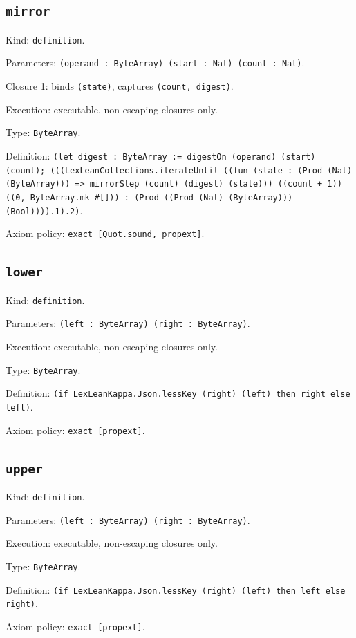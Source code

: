 \documentclass[11pt]{article}
\begin{document}
\subsection*{\texttt{mirror}}
\noindent Kind: \texttt{definition}.\par
\noindent Parameters: \texttt{(operand : ByteArray) (start : Nat) (count : Nat)}.\par
\noindent Closure 1: binds \texttt{(state)}, captures \texttt{(count, digest)}.\par
\noindent Execution: executable, non-escaping closures only.\par
\noindent Type: \texttt{ByteArray}.\par
\noindent Definition: \texttt{(let digest : ByteArray := digestOn (operand) (start) (count); (((LexLeanCollections.iterateUntil ((fun (state : (Prod (Nat) (ByteArray))) => mirrorStep (count) (digest) (state))) ((count + 1)) ((0, ByteArray.mk \#[])) : (Prod ((Prod (Nat) (ByteArray))) (Bool)))).1).2)}.\par
\noindent Axiom policy: \texttt{exact [Quot.sound, propext]}.\par
\subsection*{\texttt{lower}}
\noindent Kind: \texttt{definition}.\par
\noindent Parameters: \texttt{(left : ByteArray) (right : ByteArray)}.\par
\noindent Execution: executable, non-escaping closures only.\par
\noindent Type: \texttt{ByteArray}.\par
\noindent Definition: \texttt{(if LexLeanKappa.Json.lessKey (right) (left) then right else left)}.\par
\noindent Axiom policy: \texttt{exact [propext]}.\par
\subsection*{\texttt{upper}}
\noindent Kind: \texttt{definition}.\par
\noindent Parameters: \texttt{(left : ByteArray) (right : ByteArray)}.\par
\noindent Execution: executable, non-escaping closures only.\par
\noindent Type: \texttt{ByteArray}.\par
\noindent Definition: \texttt{(if LexLeanKappa.Json.lessKey (right) (left) then left else right)}.\par
\noindent Axiom policy: \texttt{exact [propext]}.\par
\end{document}
